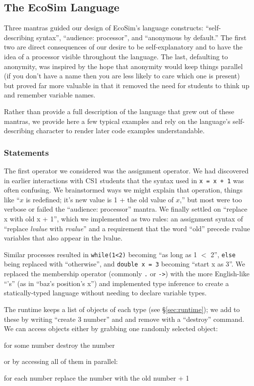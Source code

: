 \documentclass{sig-alternate}
\newcommand{\INDSTATE}[1][1]{\STATE\hspace{#1\algorithmicindent}}
\newcommand{\EcoSim}{EcoSim}
\newenvironment{snippet}{\begin{algorithmic}[1]}{\end{algorithmic}}
\begin{document}
\subsection{The \EcoSim{} Language}
Three mantras guided our design of \EcoSim{}'s language constructs:
``self-describing syntax'', ``audience: processor'', and ``anonymous by default.''
The first two are direct consequences of our desire to be self-explanatory 
and to have the idea of a processor visible throughout the language.
The last, defaulting to anonymity,
was inspired by the hope that anonymity would keep things parallel 
(if you don't have a name then you are less likely to care which one is present)
but proved far more valuable in that it removed the need 
for students to think up and remember variable names.

Rather than provide a full description of the language that grew out of these mantras,
we provide here a few typical examples
and rely on the language's self-describing character 
to render later code examples understandable.

\subsubsection{Statements}
The first operator we considered was the assignment operator.
We had discovered in earlier interactions with CS1 students
that the syntax used in \texttt{x = x + 1} was often confusing.
We brainstormed ways we might explain that operation,
things like ``$x$ is redefined; it's new value is 1 + the old value of $x$,''
but most were too verbose or failed the ``audience: processor'' mantra.
We finally settled on ``replace x with old x + 1'',
which we implemented as two rules:
an assignment syntax of ``replace \emph{lvalue} with \emph{rvalue}''
and a requirement that the word ``old'' precede rvalue variables that also appear in the lvalue.

Similar processes resulted in 
\texttt{while(1<2)} becoming ``as long as 1 $<$ 2'',
\texttt{else} being replaced with ``otherwise'', 
and \texttt{double x = 3} becoming ``start x as 3''.
We replaced the membership operator (commonly \texttt{.} or \mbox{\texttt{->}})
with the more English-like ``'s'' (as in ``baz's position's x'')
and implemented type inference to create a statically-typed language 
without needing to declare variable types.

The runtime keeps a list of objects of each type (see \S\ref{sec:runtime});
we add to these by writing ``create 3 number'' and and remove with a ``destroy'' command.
We can access objects either by grabbing one randomly selected object:
\begin{snippet}
\STATE for some number
\INDSTATE destroy the number
\end{snippet}
or by accessing all of them in parallel:
\begin{snippet}
\STATE for each number
\INDSTATE replace the number with the old number + 1
\end{snippet}
\end{document}
